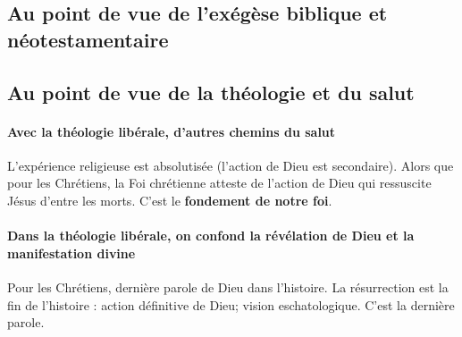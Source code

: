 \subsection{Au point de vue de l’exégèse biblique et néotestamentaire}
 \subsection{Au point de vue de la théologie et du salut}
  \paragraph{Avec la théologie libérale, d'autres chemins du salut} L'expérience religieuse est absolutisée (l'action de Dieu est secondaire). Alors que pour les Chrétiens, la Foi chrétienne atteste de l'action de Dieu qui ressuscite Jésus d'entre les morts. C'est le \textbf{fondement de notre foi}. 
 \paragraph{Dans la théologie libérale, on confond la révélation de Dieu et la manifestation divine} Pour les Chrétiens, dernière parole de Dieu dans l'histoire. 
La résurrection est la fin de l'histoire : action définitive de Dieu; vision eschatologique. C'est la dernière parole. 